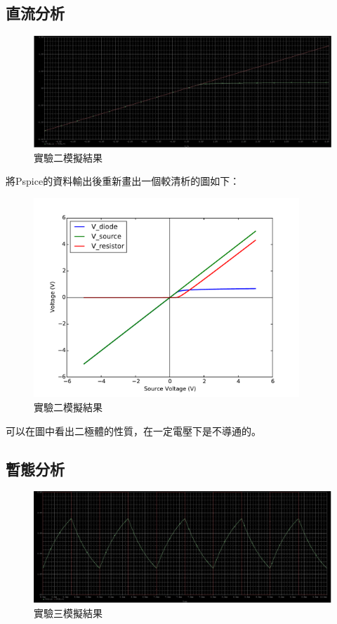 \documentclass[12pt, a4paper]{article}
\begin{document}
\clearpage

\subsection{直流分析}

\begin{figure}[H]
	\begin{center}
		\includegraphics[width=15cm]{data/q2.jpg}
		\caption{實驗二模擬結果}
		\label{fig:fig2}
	\end{center}
\end{figure}

將Pspice的資料輸出後重新畫出一個較清析的圖如下：
\begin{figure}[H]
	\begin{center}
		\includegraphics[width=10cm]{data/q2i.pdf}
		\caption{實驗二模擬結果}
		\label{fig:fig2-1}
	\end{center}
\end{figure}
可以在圖中看出二極體的性質，在一定電壓下是不導通的。

\subsection{暫態分析}

\begin{figure}[H]
	\begin{center}
		\includegraphics[width=15cm]{data/q3.jpg}
		\caption{實驗三模擬結果}
		\label{fig:fig3}
	\end{center}
\end{figure}
\end{document}
